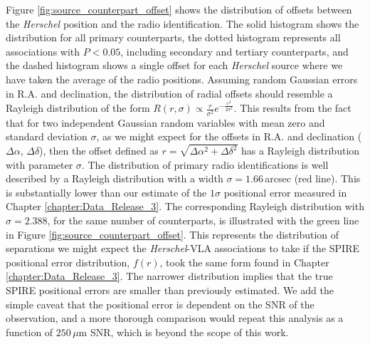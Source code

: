 Figure \ref{fig:source_counterpart_offset} shows the distribution of offsets between the \textit{Herschel} position and the radio identification. The solid histogram shows the distribution for all primary counterparts, the dotted histogram represents all associations with $P < 0.05$, including secondary and tertiary counterparts, and the dashed histogram shows a single offset for each \textit{Herschel} source where we have taken the average of the radio positions. Assuming random Gaussian errors in R.A. and declination, the distribution of radial offsets should resemble a Rayleigh distribution of the form $R(r, \sigma) \propto \frac{r}{\sigma^2}e^{-\frac{r^2}{2\sigma^2}}$. This results from the fact that for two independent Gaussian random variables with mean zero and standard deviation $\sigma$, as we might expect for the offsets in R.A. and declination ($\Delta\alpha$, $\Delta\delta$), then the offset defined as $r = \sqrt{\Delta\alpha^2 + \Delta\delta^2}$ has a Rayleigh distribution with parameter $\sigma$. The distribution of primary radio identifications is well described by a Rayleigh distribution with a width $\sigma = 1.66\,$arcsec (red line). This is substantially lower than our estimate of the $1\sigma$ positional error measured in Chapter \ref{chapter:Data_Release_3}. The corresponding Rayleigh distribution with $\sigma = 2.388$, for the same number of counterparts, is illustrated with the green line in Figure \ref{fig:source_counterpart_offset}. This represents the distribution of separations we might expect the \textit{Herschel}-VLA associations to take if the SPIRE positional error distribution, $f(r)$, took the same form found in Chapter \ref{chapter:Data_Release_3}. The narrower distribution implies that the true SPIRE positional errors are smaller than previously estimated. We add the simple caveat that the positional error is dependent on the SNR of the observation, and a more thorough comparison would repeat this analysis as a function of $250\,\mu$m SNR, which is beyond the scope of this work.

